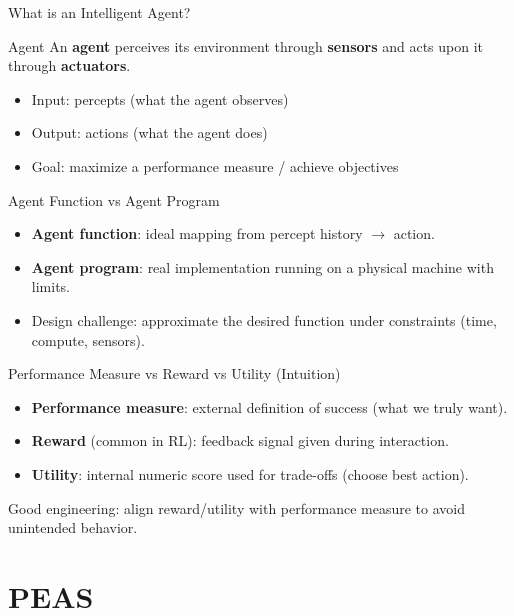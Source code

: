 \documentclass[aspectratio=169]{beamer}
\begin{document}
\begin{frame}{What is an Intelligent Agent?}
  \begin{block}{Agent}
    An \textbf{agent} perceives its environment through \textbf{sensors} and acts upon it through \textbf{actuators}.
  \end{block}
  \vspace{0.4em}
  \begin{itemize}[<+->]
    \item Input: percepts (what the agent observes)
    \item Output: actions (what the agent does)
    \item Goal: maximize a performance measure / achieve objectives
  \end{itemize}
\end{frame}

\begin{frame}{Agent Function vs Agent Program}
  \begin{itemize}[<+->]
    \item \textbf{Agent function}: ideal mapping from percept history $\rightarrow$ action.
    \item \textbf{Agent program}: real implementation running on a physical machine with limits.
    \item Design challenge: approximate the desired function under constraints (time, compute, sensors).
  \end{itemize}
\end{frame}

\begin{frame}{Performance Measure vs Reward vs Utility (Intuition)}
  \begin{itemize}[<+->]
    \item \textbf{Performance measure}: external definition of success (what we truly want).
    \item \textbf{Reward} (common in RL): feedback signal given during interaction.
    \item \textbf{Utility}: internal numeric score used for trade-offs (choose best action).
  \end{itemize}
  \vspace{0.4em}
  Good engineering: align reward/utility with performance measure to avoid unintended behavior.
\end{frame}

\section{PEAS}
\label{sec:peas}
\end{document}
